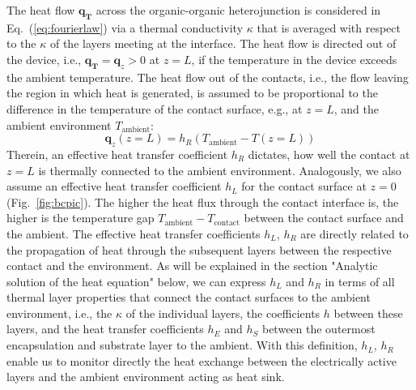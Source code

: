 \documentclass[%
9pt,
 aip,
rsi,%
 amsmath,amssymb,
preprint,%
]{revtex4-1}
\begin{document}
The heat flow $\mathbf{q_T}$ across the organic-organic heterojunction is considered in Eq.~(\ref{eq:fourierlaw}) via a thermal conductivity $\kappa$ that is averaged with respect to the $\kappa$ of the layers meeting at the interface.
The heat flow is directed out of the device, i.e., $\mathbf{q_T} = \mathbf{q}_z > 0$ at $z=L$,  if the temperature in the device exceeds the ambient temperature.
The heat flow out of the contacts, i.e., the flow leaving the region in which heat is generated, is assumed to be proportional to the difference in the temperature of the contact surface, e.g., at $z=L$, and the ambient environment $T_{\mathrm{ambient}}$:
\begin{equation}
	\label{eq:bcheatflux}
	\mathbf{q}_z\left(z=L\right)=h_{R}\left(T_{\mathrm{ambient}}-T\left(z=L\right)\right)
\end{equation}
Therein, an effective heat transfer coefficient $h_R$ dictates, how well the contact at $z=L$ is thermally connected to the ambient environment. 
Analogously, we also assume an effective heat transfer coefficient $h_L$ for the contact surface at $z=0$ (Fig.~\ref{fig:bcpic}).
The higher the heat flux through the contact interface is, the higher is the temperature gap $T_{\mathrm{ambient}}-T_{\mathrm{contact}}$ between the contact surface and the ambient.
The effective heat transfer coefficients $h_L$, $h_R$ are directly related to the propagation of heat through the subsequent layers between the respective contact and the environment. 
As will be explained in the section "Analytic solution of the heat equation" below, we can express $h_{L}$ and $h_{R}$ in terms of all thermal layer properties that connect the contact surfaces %
to the ambient environment, i.e., the $\kappa$ of the individual layers, the coefficients $h$ between these layers, and the heat transfer coefficients $h_{E}$ and $h_{S}$ between the outermost encapsulation and substrate layer to the ambient.
With this definition, $h_L$, $h_R$ enable us to monitor directly the heat exchange between the electrically active layers and the ambient environment acting as heat sink.
\end{document}
